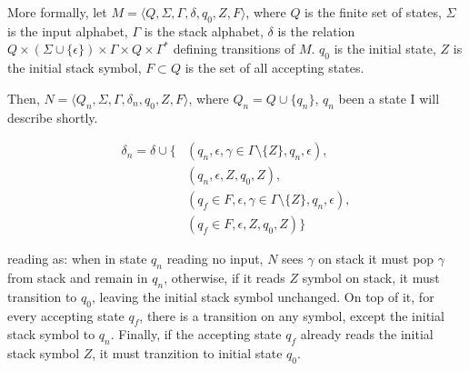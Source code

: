 \documentclass[11pt]{article}
\begin{document}
More formally, let $M=\langle Q, \Sigma, \Gamma, \delta, q_0, Z, F \rangle$,
where $Q$ is the finite set of states, $\Sigma$ is the input alphabet,
$\Gamma$ is the stack alphabet, $\delta$ is the relation $Q \times (\Sigma
    \cup \{ \epsilon \}) \times \Gamma \times Q \times \Gamma^*$ defining
transitions of $M$.  $q_0$ is the initial state, $Z$ is the initial stack
symbol, $F \subset Q$ is the set of all accepting states.

Then, $N=\langle Q_n, \Sigma, \Gamma, \delta_n, q_0, Z, F \rangle$, where
$Q_n = Q \cup \{q_n\}$, $q_n$ been a state I will describe shortly.

\begin{align*}
  \delta_n = \delta \cup
  \{&(q_n, \epsilon, \gamma \in \Gamma \setminus \{Z\}, q_n, \epsilon), \\
    &(q_n, \epsilon, Z, q_0, Z), \\
    &(q_f \in F, \epsilon, \gamma \in \Gamma \setminus \{Z\}, q_n, \epsilon), \\
    &(q_f \in F, \epsilon, Z, q_0, Z)\}
\end{align*}


reading as: when in state $q_n$ reading no input, $N$ sees $\gamma$ on stack
it must pop $\gamma$ from stack and remain in $q_n$, otherwise, if it reads
$Z$ symbol on stack, it must transition to $q_0$, leaving the initial stack
symbol unchanged.  On top of it, for every accepting state $q_f$, there is a
transition on any symbol, except the initial stack symbol to $q_n$.
Finally, if the accepting state $q_f$ already reads the initial stack symbol
$Z$, it must tranzition to initial state $q_0$.
\end{document}
